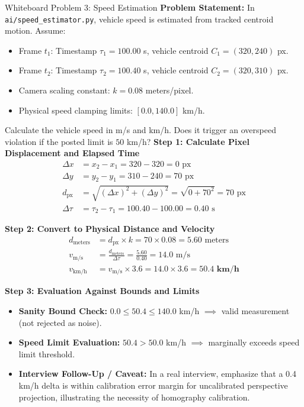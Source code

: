 \begin{interviewq}{Whiteboard Problem 3: Speed Estimation}
\textbf{Problem Statement:}
In \texttt{ai/speed\_estimator.py}, vehicle speed is estimated from tracked centroid motion. Assume:
\begin{itemize}
    \item Frame $t_1$: Timestamp $\tau_1 = 100.00$ s, vehicle centroid $C_1 = (320, 240)$ px.
    \item Frame $t_2$: Timestamp $\tau_2 = 100.40$ s, vehicle centroid $C_2 = (320, 310)$ px.
    \item Camera scaling constant: $k = 0.08$ meters/pixel.
    \item Physical speed clamping limits: $[0.0, 140.0]$ km/h.
\end{itemize}
Calculate the vehicle speed in m/s and km/h. Does it trigger an overspeed violation if the posted limit is $50$ km/h?
\tcblower
\textbf{Step 1: Calculate Pixel Displacement and Elapsed Time}
\begin{align*}
\Delta x &= x_2 - x_1 = 320 - 320 = 0 \text{ px} \\
\Delta y &= y_2 - y_1 = 310 - 240 = 70 \text{ px} \\
d_{\text{px}} &= \sqrt{(\Delta x)^2 + (\Delta y)^2} = \sqrt{0 + 70^2} = 70 \text{ px} \\[6pt]
\Delta \tau &= \tau_2 - \tau_1 = 100.40 - 100.00 = 0.40 \text{ s}
\end{align*}

\textbf{Step 2: Convert to Physical Distance and Velocity}
\begin{align*}
d_{\text{meters}} &= d_{\text{px}} \times k = 70 \times 0.08 = 5.60 \text{ meters} \\[6pt]
v_{\text{m/s}} &= \frac{d_{\text{meters}}}{\Delta \tau} = \frac{5.60}{0.40} = 14.0 \text{ m/s} \\[6pt]
v_{\text{km/h}} &= v_{\text{m/s}} \times 3.6 = 14.0 \times 3.6 = \mathbf{50.4 \text{ km/h}}
\end{align*}

\textbf{Step 3: Evaluation Against Bounds and Limits}
\begin{itemize}
    \item \textbf{Sanity Bound Check:} $0.0 \le 50.4 \le 140.0$ km/h $\implies$ valid measurement (not rejected as noise).
    \item \textbf{Speed Limit Evaluation:} $50.4 > 50.0$ km/h $\implies$ marginally exceeds speed limit threshold.
    \item \textbf{Interview Follow-Up / Caveat:} In a real interview, emphasize that a 0.4 km/h delta is within calibration error margin for uncalibrated perspective projection, illustrating the necessity of homography calibration.
\end{itemize}
\end{interviewq}

